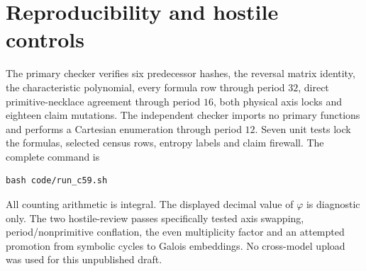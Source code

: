 \section{Reproducibility and hostile controls}

The primary checker verifies six predecessor hashes, the reversal matrix
identity, the characteristic polynomial, every formula row through period
$32$, direct primitive-necklace agreement through period $16$, both physical
axis locks and eighteen claim mutations.  The independent checker imports no
primary functions and performs a Cartesian enumeration through period $12$.
Seven unit tests lock the formulas, selected census rows, entropy labels and
claim firewall.  The complete command is
\begin{verbatim}
bash code/run_c59.sh
\end{verbatim}

All counting arithmetic is integral.  The displayed decimal value of
$\varphi$ is diagnostic only.  The two hostile-review passes specifically
tested axis swapping, period/nonprimitive conflation, the even multiplicity
factor and an attempted promotion from symbolic cycles to Galois embeddings.
No cross-model upload was used for this unpublished draft.
